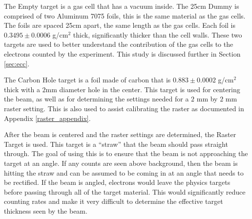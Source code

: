 
The Empty target is a gas cell that has a vacuum inside. The 25cm Dummy is comprised of two Aluminum 7075 foils, this is the same material as the gas cells. The foils are spaced 25cm apart, the same length as the gas cells.  Each foil is $0.3495\pm0.0006$ g/cm$^2$ thick, significantly thicker than the cell walls. These two targets are used to better understand the contribution of the gas cells to the electrons counted by the experiment. This study is discussed further in Section \ref{sec:ecc}.

The Carbon Hole target is a foil made of carbon that is $0.883\pm0.0002$ g/cm$^2$ thick with a $2$mm diameter hole in the center. This target is used for centering the beam, as well as for determining the settings needed for a $2$ mm by $2$ mm raster setting. This is also used to assist calibrating the raster as documented in Appendix \ref{raster_appendix}.

After the beam is centered and the raster settings are determined, the Raster Target is used. This target is a ``straw'' that the beam should pass straight through. The goal of using this is to ensure that the beam is not approaching the target at an angle. If any counts are seen above background, then the beam is hitting the straw and can be assumed to be coming in at an angle that needs to be rectified. If the beam is angled, electrons would leave the physics targets before passing through all of the target material. This would significantly reduce counting rates and make it very difficult to determine the effective target thickness seen by the beam.